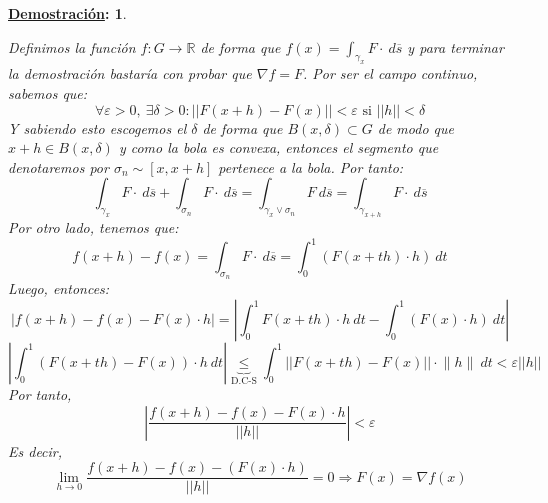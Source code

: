 \documentclass[10pt,a4paper,openright]{book}
\theoremstyle{break}
\newtheorem*{demo}{\underline{Demostración}:}
\newcommand{\dif}[1]{\ d#1}
\begin{document}
\begin{demo}
\begin{itemize}
Definimos la función $f: G \rightarrow \mathbb{R}$ de forma que $f\left( x \right) = \int_{\gamma_x} F \cdot \dif{\overline{s}}$ y para terminar la demostración bastaría con probar que $\nabla f = F$.
Por ser el campo continuo, sabemos que:
$$\forall \varepsilon > 0,\ \exists \delta > 0: \lvert \lvert F\left( x + h \right) - F\left( x \right) \rvert \rvert < \varepsilon \text{ si } \lvert \lvert h \rvert \rvert < \delta$$
Y sabiendo esto escogemos el $\delta$ de forma que $B\left( x, \delta \right) \subset G$ de modo que $x+h \in B(x,\delta)$ y como la bola es convexa, entonces el segmento que denotaremos por $\sigma_n \sim \left[ x, x + h \right]$ pertenece a la bola. Por tanto:
$$\int_{\gamma_x} F\cdot \dif{\overline{s}} + \int_{\sigma_n} F \cdot \dif{\overline{s}} = \int_{\gamma_x \lor \sigma_n} F \dif{\overline{s}} = \int_{\gamma_{x + h}} F \cdot \dif{\overline{s}}$$
Por otro lado, tenemos que:
$$f\left( x + h \right) - f\left( x \right) = \int_{\sigma_n} F \cdot \dif{\overline{s}} = \int_{0}^{1} \left( F\left( x + th \right) \cdot h \right) \dif{t}$$
Luego, entonces:
$$\left\lvert f\left( x + h \right) - f\left( x \right) - F\left( x \right) \cdot h \right\rvert = \left\lvert \int_{0}^{1} F\left( x + th \right) \cdot h \dif{t} - \int_{0}^{1} \left( F\left( x \right) \cdot h\right) \dif{t} \right\rvert$$
$$\left\lvert \int_{0}^{1} \left( F\left( x + th \right) - F\left( x \right) \right) \cdot h \dif{t} \right\rvert \underbrace{\le}_{\text{D.C-S}} \int_{0}^{1} \lvert \lvert F\left( x + th \right) - F\left( x \right) \rvert \rvert \cdot \lVert h \rVert \dif{t} < \varepsilon \lvert \lvert h \rvert \rvert$$
Por tanto, 
$$\left\lvert \frac{f\left( x + h \right) - f\left( x \right) - F\left( x \right) \cdot h}{\lvert \lvert h \rvert \rvert} \right\rvert < \varepsilon$$
Es decir, 
$$\lim_{h \rightarrow 0} \frac{f\left( x + h \right) - f\left( x \right) - \left( F\left( x \right) \cdot h \right)}{\lvert \lvert h \rvert \rvert} = 0 \Rightarrow F\left( x \right) = \nabla f\left( x \right) $$
\end{itemize}
\end{demo}
\end{document}
